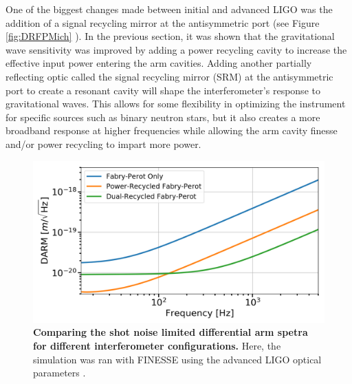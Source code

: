 		One of the biggest changes made between initial and advanced LIGO was the addition of a signal recycling mirror at the antisymmetric port (see Figure \ref{fig:DRFPMich} ). In the previous section, it was shown that the gravitational wave sensitivity was improved by adding a power recycling cavity to increase the effective input power entering the arm cavities.  Adding another partially reflecting optic called the signal recycling mirror (SRM) at the antisymmetric port to create a resonant cavity will shape the interferometer's response to gravitational waves.  This allows for some flexibility in optimizing the instrument for specific sources such as binary neutron stars, but it also creates a more broadband response at higher frequencies while allowing the arm cavity finesse and/or power recycling to impart more power.
		\begin{figure}[ht]
			\centering
			\includegraphics[width=0.8 \textwidth]{../Figures/SN_Lim_Sense.png}
			\caption[Comparing the shot noise limited differential arm spetra for different interferometer configurations.]
			{\textbf{Comparing the shot noise limited differential arm spetra for different interferometer configurations.} Here, the simulation was ran with FINESSE \cite{FinesseManual} using the advanced LIGO optical parameters \cite{FinesseH1}. }
			\label{fig:DRMICH_sense}
		\end{figure}
		
